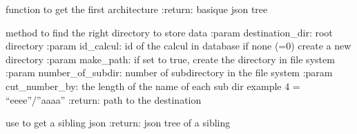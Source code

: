 \documentclass[letterpaper,10pt,english]{sphinxmanual}
\begin{document}

\begin{fulllineitems}
\label{\detokenize{QuChemPedIA.QuChemPedIA_lib:QuChemPedIA.QuChemPedIA_lib.import_file_lib.get_base_json}}
function to get the first architecture
:return: basique json tree

\end{fulllineitems}


\begin{fulllineitems}
\label{\detokenize{QuChemPedIA.QuChemPedIA_lib:QuChemPedIA.QuChemPedIA_lib.import_file_lib.get_path_to_store}}
method to find the right directory to store data
:param destination\_dir: root directory
:param id\_calcul: id of the calcul in database if none (=0) create a new directory
:param make\_path: if set to true, create the directory in file system
:param number\_of\_subdir: number of subdirectory in the file system
:param cut\_number\_by: the length of the name of each sub dir example 4 = “eeee”/”aaaa”
:return: path to the destination

\end{fulllineitems}


\begin{fulllineitems}
\label{\detokenize{QuChemPedIA.QuChemPedIA_lib:QuChemPedIA.QuChemPedIA_lib.import_file_lib.get_siblings_json}}
use to get a sibling json
:return: json tree of a sibling

\end{fulllineitems}

\end{document}
